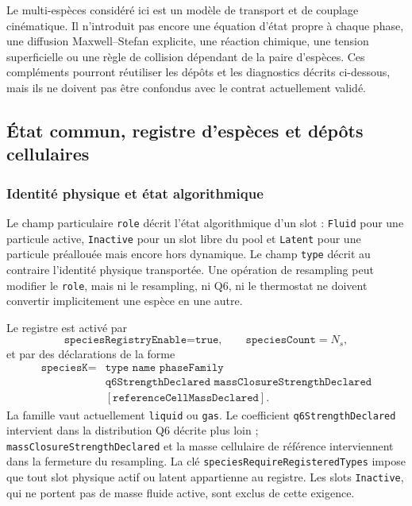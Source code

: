 \documentclass[11pt,a4paper]{article}
\begin{document}
Le multi-espèces considéré ici est un modèle de transport et de couplage cinématique. Il n'introduit pas encore une équation d'état propre à chaque phase, une diffusion Maxwell--Stefan explicite, une réaction chimique, une tension superficielle ou une règle de collision dépendant de la paire d'espèces. Ces compléments pourront réutiliser les dépôts et les diagnostics décrits ci-dessous, mais ils ne doivent pas être confondus avec le contrat actuellement validé.

\subsection{État commun, registre d'espèces et dépôts cellulaires}

\subsubsection{Identité physique et état algorithmique}

Le champ particulaire \texttt{role} décrit l'état algorithmique d'un slot : \texttt{Fluid} pour une particule active, \texttt{Inactive} pour un slot libre du pool et \texttt{Latent} pour une particule préallouée mais encore hors dynamique. Le champ \texttt{type} décrit au contraire l'identité physique transportée. Une opération de resampling peut modifier le \texttt{role}, mais ni le resampling, ni Q6, ni le thermostat ne doivent convertir implicitement une espèce en une autre.

Le registre est activé par
\begin{equation}
  \texttt{speciesRegistryEnable=true},
  \qquad \texttt{speciesCount}=N_s,
\end{equation}
et par des déclarations de la forme
\begin{equation}
\begin{aligned}
  \texttt{speciesK} ={}& \texttt{type name phaseFamily}\\
  &\texttt{q6StrengthDeclared massClosureStrengthDeclared}\\
  &[\texttt{referenceCellMassDeclared}].
\end{aligned}
\end{equation}
La famille vaut actuellement \texttt{liquid} ou \texttt{gas}. Le coefficient \texttt{q6StrengthDeclared} intervient dans la distribution Q6 décrite plus loin ; \texttt{massClosureStrengthDeclared} et la masse cellulaire de référence interviennent dans la fermeture du resampling. La clé \texttt{speciesRequireRegisteredTypes} impose que tout slot physique actif ou latent appartienne au registre. Les slots \texttt{Inactive}, qui ne portent pas de masse fluide active, sont exclus de cette exigence.
\end{document}
